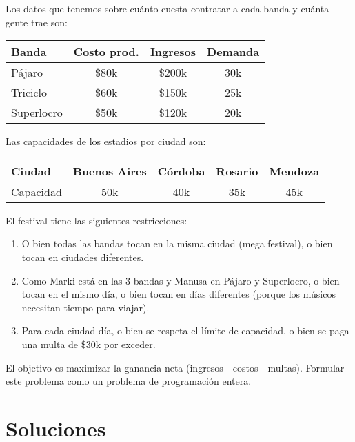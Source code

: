 \documentclass[12pt]{article}
\begin{document}
\vspace{0.5em}

Los datos que tenemos sobre cuánto cuesta contratar a cada banda y cuánta gente trae son:
\begin{table}[H]
\centering
\begin{tabular}{lccc}
\toprule
\textbf{Banda} & \textbf{Costo prod.} & \textbf{Ingresos} & \textbf{Demanda} \\
\midrule
Pájaro & \$80k & \$200k & 30k \\
Triciclo & \$60k & \$150k & 25k \\
Superlocro & \$50k & \$120k & 20k \\
\bottomrule
\end{tabular}
\end{table}

Las capacidades de los estadios por ciudad son:
\begin{table}[H]
\centering
\begin{tabular}{lcccc}
\toprule
\textbf{Ciudad} & \textbf{Buenos Aires} & \textbf{Córdoba} & \textbf{Rosario} & \textbf{Mendoza} \\
\midrule
Capacidad & 50k & 40k & 35k & 45k \\
\bottomrule
\end{tabular}
\end{table}

El festival tiene las siguientes restricciones:
\begin{enumerate}[label=\arabic*.]
    \item O bien todas las bandas tocan en la misma ciudad (mega festival), o bien tocan en ciudades diferentes.
    \item Como Marki está en las 3 bandas y Manusa en Pájaro y Superlocro, o bien tocan en el mismo día, o bien tocan en días diferentes (porque los músicos necesitan tiempo para viajar).
    \item Para cada ciudad-día, o bien se respeta el límite de capacidad, o bien se paga una multa de \$30k por exceder.
\end{enumerate}

El objetivo es maximizar la ganancia neta (ingresos - costos - multas). Formular este problema como un problema de programación entera.

\newpage

\section{Soluciones}
\end{document}
